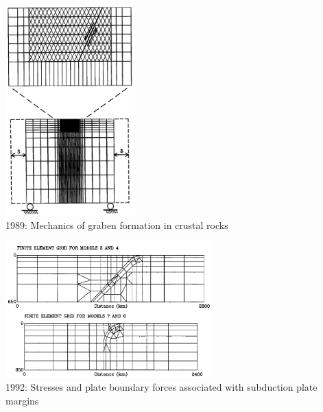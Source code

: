 \begin{center}
\begin{minipage}{0.35\textwidth}
\centering
\includegraphics[width=5cm]{images/history/mewi89}\\
{\scriptsize 1989: Mechanics of graben formation in crustal rocks \cite{mewi89}}
\end{minipage}\hfill
\begin{minipage}{0.55\textwidth}
\centering
\includegraphics[width=8cm]{images/history/whbw92}\\
{\scriptsize 1992: Stresses and plate boundary forces associated with subduction plate margins
\cite{whbw92}}
\end{minipage}
\end{center}


